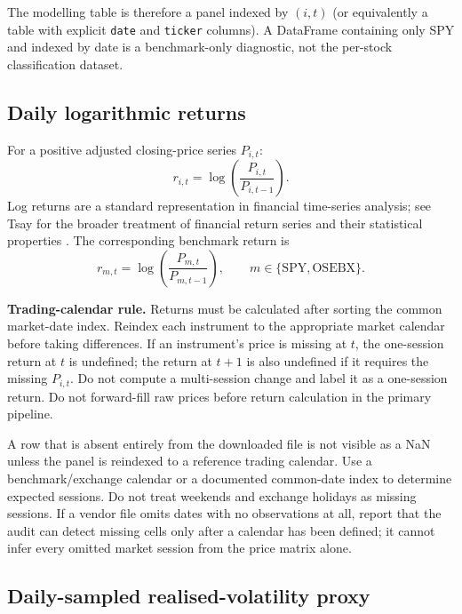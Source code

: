 \documentclass[11pt,a4paper]{article}
\begin{document}
The modelling table is therefore a panel indexed by $(i,t)$ (or equivalently a table with explicit \texttt{date} and \texttt{ticker} columns). A DataFrame containing only SPY and indexed by date is a benchmark-only diagnostic, not the per-stock classification dataset.

\subsection{Daily logarithmic returns}

For a positive adjusted closing-price series $P_{i,t}$:
\begin{equation}
  r_{i,t}=\log\!\left(\frac{P_{i,t}}{P_{i,t-1}}\right).
  \label{eq:logreturn}
\end{equation}
Log returns are a standard representation in financial time-series analysis; see Tsay for the broader treatment of financial return series and their statistical properties \cite{Tsay2010}. The corresponding benchmark return is
\begin{equation}
  r_{m,t}=\log\!\left(\frac{P_{m,t}}{P_{m,t-1}}\right),
  \qquad m\in\{\mathrm{SPY},\mathrm{OSEBX}\}.
\end{equation}

\textbf{Trading-calendar rule.} Returns must be calculated after sorting the common market-date index. Reindex each instrument to the appropriate market calendar before taking differences. If an instrument's price is missing at $t$, the one-session return at $t$ is undefined; the return at $t+1$ is also undefined if it requires the missing $P_{i,t}$. Do not compute a multi-session change and label it as a one-session return. Do not forward-fill raw prices before return calculation in the primary pipeline.

A row that is absent entirely from the downloaded file is not visible as a NaN unless the panel is reindexed to a reference trading calendar. Use a benchmark/exchange calendar or a documented common-date index to determine expected sessions. Do not treat weekends and exchange holidays as missing sessions. If a vendor file omits dates with no observations at all, report that the audit can detect missing cells only after a calendar has been defined; it cannot infer every omitted market session from the price matrix alone.

\subsection{Daily-sampled realised-volatility proxy}
\end{document}
